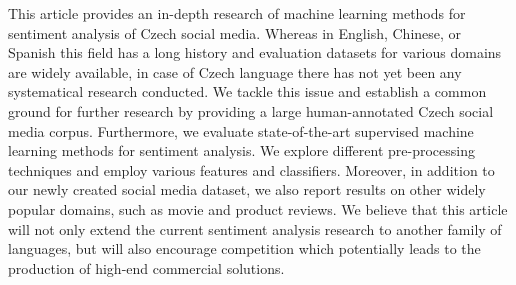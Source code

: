 This article provides an in-depth research of machine learning methods for sentiment analysis of Czech social media. Whereas in English, Chinese, or
 Spanish this field has a long history and evaluation datasets for various
 domains are widely available, in case of Czech language there has not yet been
 any systematical research conducted. We tackle this issue and establish a
 common ground for further research by providing a large human-annotated Czech
 social media corpus. Furthermore, we evaluate state-of-the-art supervised
 machine learning methods for sentiment analysis. We explore different
 pre-processing techniques and employ various features and classifiers.
 Moreover, in addition to our newly created social media dataset, we also report
 results on other widely popular domains, such as movie and product reviews. We
 believe that this article will not only extend the current sentiment analysis
 research to another family of languages, but will also encourage competition
 which potentially leads to the production of high-end commercial solutions.

